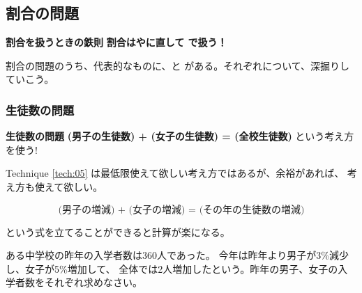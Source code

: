\subsection{割合の問題}

    \begin{techniquebox}[tech:04]{\textbf{割合を扱うときの鉄則}}
        \textbf{割合は\fitblankbf[分数]{}や\fitblankbf[小数]{}に直して
        \fitblankbf[かけ算]{}で扱う！}
    \end{techniquebox}

    割合の問題のうち、代表的なものに、と
    がある。それぞれについて、深掘りしていこう。

    \subsubsection{生徒数の問題}
    \vspace{1em}

        \begin{techniquebox}[tech:05]{\textbf{生徒数の問題}}
            \textbf{(男子の生徒数) + (女子の生徒数) = (全校生徒数)} という考え方を使う!
        \end{techniquebox}

        Technique \ref{tech:05} は最低限使えて欲しい考え方ではあるが、余裕があれば、
        考え方も使えて欲しい。

        \[\textbf{(男子の増減) + (女子の増減) = (その年の生徒数の増減)}\]

        \vspace{1.5em}
        という式を立てることができると計算が楽になる。

        \begin{example}[【例題 3】]
            ある中学校の昨年の入学者数は360人であった。
            今年は昨年より男子が3\%減少し、女子が5\%増加して、
            全体では2人増加したという。昨年の男子、女子の入学者数をそれぞれ求めなさい。
        \end{example}

